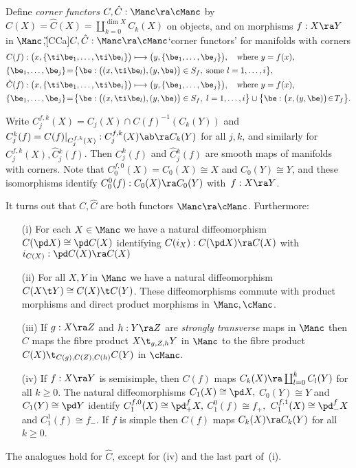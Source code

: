 \documentclass{article}
\begin{document}
\begin{dfn} Define {\it corner functors\/} $C,\hat C:\Manc\ra\cManc$
by $C(X)=\hat C(X)=\coprod_{k=0}^{\dim X}C_k(X)$ on objects, and on
morphisms $f:X\ra Y$ in $\Manc$,\G[CCa]{$C,\hat
C:\Manc\ra\cManc$}{`corner functors' for manifolds with corners}
\begin{align*}
&C(f):\bigl(x,\{\ti\be_1,\ldots,\ti\be_i\}\bigr)\longmapsto
\bigl(y,\{\be_1,\ldots,\be_j\}\bigr),\quad\text{where $y=f(x)$,}\\
&\{\be_1,\ldots,\be_j\}\!=\!\bigl\{\be:\bigl((x,\ti\be_l),(y,\be)\bigr)
\in S_f,\; \text{some $l=1,\ldots,i$}\bigr\},
\\
&\hat C(f):\bigl(x,\{\ti\be_1,\ldots,\ti\be_i\}\bigr)\longmapsto
\bigl(y,\{\be_1,\ldots,\be_j\}\bigr),\quad\text{where $y=f(x)$,}\\
&\{\be_1,\ldots,\be_j\}\!=\!\bigl\{\be:\bigl((x,\ti\be_l),(y,\be)\bigr)
\in S_f,\; l=1,\ldots,i\bigr\}\cup\bigl\{\be:\bigl(x,(y,\be)\bigr)
\!\in\! T_f\bigr\}.
\end{align*}

Write $C_j^{f,k}(X)=C_j(X)\cap C(f)^{-1}(C_k(Y))$ and
$C_j^k(f)=C(f)\vert_{C_j^{f,k}(X)}:C_j^{f,k}(X)\ab\ra C_k(Y)$ for
all $j,k$, and similarly for $\hat C{}_j^{f,k}(X),\hat C{}_j^k(f)$.
Then $C_j^k(f)$ and $\hat C{}_j^k(f)$ are smooth maps of manifolds
with corners. Note that $C_0^{f,0}(X)=C_0(X)\cong X$ and
$C_0(Y)\cong Y$, and these isomorphisms identify $C_0^0(f):C_0(X)\ra
C_0(Y)$ with~$f:X\ra Y$.
\label{ds5def6}
\end{dfn}

It turns out that $C,\hat C$ are both functors $\Manc\ra\cManc$.
Furthermore:
\begin{itemize}
\setlength{\itemsep}{0pt}
\setlength{\parsep}{0pt}
\item[(i)] For each $X\in\Manc$ we have a natural
diffeomorphism $C(\pd X)\cong \pd C(X)$ identifying
$C(i_X):C(\pd X)\ra C(X)$ with $i_{C(X)}:\pd C(X)\ra C(X)$
\item[(ii)] For all $X,Y$ in $\Manc$ we have a natural
diffeomorphism $C(X\t Y)\cong C(X)\t C(Y)$. These
diffeomorphisms commute with product morphisms and direct
product morphisms in $\Manc,\cManc$.
\item[(iii)] If $g:X\ra Z$ and $h:Y\ra Z$ are {\it strongly
transverse\/} maps in $\Manc$ then $C$ maps the fibre product
$X\t_{g,Z,h}Y$ in $\Manc$ to the fibre product
$C(X)\t_{C(g),C(Z),C(h)}C(Y)$ in $\cManc$.
\item[(iv)] If $f:X\ra Y$ is semisimple, then $C(f)$ maps
$C_k(X)\ra \coprod_{l=0}^kC_l(Y)$ for all $k\ge 0$. The natural
diffeomorphisms $C_1(X)\cong\pd X,$ $C_0(Y)\cong Y$ and
$C_1(Y)\cong\pd Y$ identify $C_1^{f,0}(X)\cong\pd^f_+X,$
$C_1^0(f)\cong f_+,$ $C_1^{f,1}(X)\cong\pd^f_-X$ and
$C_1^1(f)\cong f_-$. If $f$ is simple then $C(f)$ maps
$C_k(X)\ra C_k(Y)$ for all~$k\ge 0$.
\end{itemize}
The analogues hold for $\hat C$, except for (iv) and the last part
of~(i).
\end{document}
